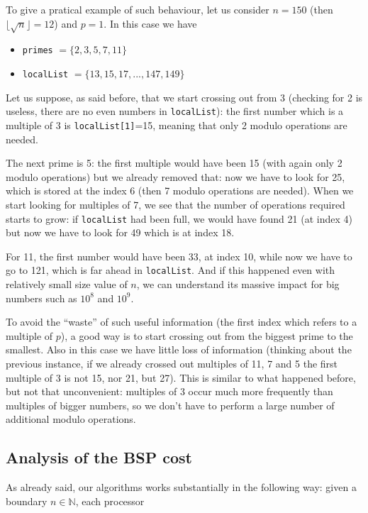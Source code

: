 \documentclass[a4paper,11pt]{article}
\newcommand{\N}{\mathbb{N}}
\begin{document}
\begin{itemize}
To give a pratical example of such behaviour, let us consider $n=150$ (then  $\lfloor \sqrt{n} \rfloor = 12$) and $p=1$. In this case we have

\begin{itemize}
\item \verb|primes| $= \{2,3,5,7,11\}$
\item \verb|localList| $= \{13,15,17,...,147,149\}$
\end{itemize}

Let us suppose, as said before, that we start crossing out from 3 (checking for 2 is useless, there are no even numbers in \verb|localList|): the first number which is a multiple of 3 is \verb|localList[1]|=15, meaning that only 2 modulo operations are needed.

The next prime is 5: the first multiple would have been 15 (with again only 2 modulo operations) but we already removed that: now we have to look for 25, which is stored at the index 6 (then 7 modulo operations are needed). When we start looking for multiples of 7, we see that the number of operations required starts to grow: if \verb|localList| had been full, we would have found 21 (at index 4) but now we have to look for 49 which is at index 18.

For 11, the first number would have been 33, at index 10, while now we have to go to 121, which is far ahead in \verb|localList|. And if this happened even with relatively small size value of $n$, we can understand its massive impact for big numbers such as $10^8$ and $10^9$.

To avoid the ``waste'' of such useful information (the first index which refers to a multiple of $p$), a good way is to start crossing out from the biggest prime to the smallest. Also in this case we have little loss of information (thinking about the previous instance, if we already crossed out multiples of 11, 7 and 5 the first multiple of 3 is not 15, nor 21, but 27). This is similar to what happened before, but not that unconvenient: multiples of 3 occur much more frequently than multiples of bigger numbers, so we don't have to perform a large number of additional modulo operations.
\end{itemize}

\subsection{Analysis of the BSP cost}

As already said, our algorithms works substantially in the following way: given a boundary $n \in \N$, each processor
\end{document}
